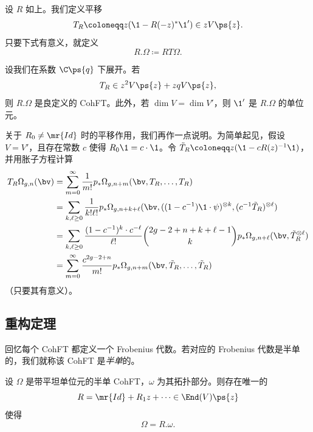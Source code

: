 \begin{defn}
    设 $R$ 如上。我们定义平移
    \[ T_R \coloneqq z (\1 - R(-z)^* \1') \in z V\ps{z}. \]
    只要下式有意义，就定义
    \[ R.\Omega \coloneqq RT\Omega. \]
\end{defn}

\begin{thm}
    设我们在系数 $\C\ps{q}$ 下展开。若
    \[ T_R \in z^2 V \ps{z} + zq V \ps{z}, \]
    则 $R.\Omega$ 是良定义的 CohFT。此外，若 $\dim V = \dim V'$，则 $\1'$ 是 $R.\Omega$ 的单位元。
\end{thm}

关于 $R_0 \neq \mr{Id}$ 时的平移作用，我们再作一点说明。为简单起见，假设 $V = V'$，且存在常数 $c$ 使得 $R_0 \1 = c \cdot \1$。令 $\tilde{T}_R \coloneqq z( \1 - c R(z)^{-1} \1)$，并用胀子方程计算
\begin{align*}
    T_R \Omega_{g,n}(\bv) &= \sum_{m=0}^{\infty} \frac{1}{m!} p_*\Omega_{g,n+m}(\bv, T_R, \ldots, T_R) \\
    &= \sum_{k,\ell \geq 0} \frac{1}{k!\ell!} p_* \Omega_{g,n+k+\ell}(\bv, ( (1-c^{-1})\1 \cdot \psi )^{\otimes k}, ( c^{-1} \tilde{T}_R )^{\otimes \ell}) \\
    &= \sum_{k,\ell \geq 0} \frac{(1-c^{-1})^k \cdot c^{-\ell}}{\ell!} \binom{2g-2+n+k+\ell-1}{k} p_* \Omega_{g,n+\ell}(\bv, \tilde{T}_R^{\otimes \ell}) \\
    &= \sum_{m=0}^{\infty} \frac{c^{2g-2+n}}{m!} p_* \Omega_{g,n+m}(\bv, \tilde{T}_R, \ldots, \tilde{T}_R)
\end{align*}
（只要其有意义）。


\subsection{重构定理}%
\label{sub:Reconstruction theorem}

回忆每个 CohFT 都定义一个 Frobenius 代数。若对应的 Frobenius 代数是半单的，我们就称该 CohFT 是\textit{半单}的。

\begin{thm}%
\label{thm:teleman}
    设 $\Omega$ 是带平坦单位元的半单 CohFT，$\omega$ 为其拓扑部分。则存在唯一的
    \[ R = \mr{Id} + R_1 z + \cdots \in \End(V)\ps{z} \]
    使得
    \[ \Omega = R.\omega. \]
\end{thm}

